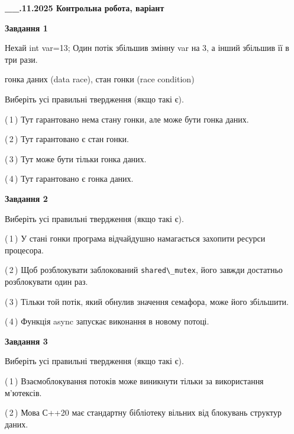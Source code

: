 \documentclass[12pt, ukrainian]{article}
\def\code#1{\Verb!#1!}
\begin{document}
\begin {large}

\textbf{\_\_.11.2025 Контрольна робота, варіант  }\par


{

\begin{center}
\textbf{Завдання 1}
\end{center}
Нехай int var=13; Один потік збільшив змінну var на 3, а інший збільшив її в три рази.

гонка даних (data race), стан гонки (race condition)

Виберіть усі правильні твердження (якщо такі є).\par
\vspace{2mm}
(\,1\,) Тут гарантовано нема стану гонки, але може бути гонка даних.%

(\,2\,) Тут гарантовано є стан гонки.%

(\,3\,) Тут може бути тільки гонка даних.%

(\,4\,) Тут гарантовано є гонка даних.%



\begin{center}
\textbf{Завдання 2}
\end{center}
Виберіть усі правильні твердження (якщо такі є).\par
\vspace{2mm}

(\,1\,) У стані гонки програма відчайдушно намагається захопити ресурси процесора.%

(\,2\,) Щоб розблокувати заблокований \code{shared\_mutex}, його завжди достатньо розблокувати один раз.%

(\,3\,) Тільки той потік, який обнулив значення семафора, може його збільшити.%

(\,4\,) Функція async запускає виконання в новому потоці.%



\begin{center}
\textbf{Завдання 3}
\end{center}
Виберіть усі правильні твердження (якщо такі є).\par
\vspace{2mm}

(\,1\,) Взаємоблокування потоків може виникнути тільки за використання м’ютексів.%

(\,2\,) Мова С++20 має стандартну бібліотеку вільних від блокувань структур даних.%

}
\end{large}
\end{document}

